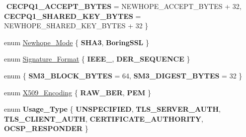 \begin{DoxyCompactItemize}
$$\newline
{\bfseries C\+E\+C\+P\+Q1\+\_\+\+A\+C\+C\+E\+P\+T\+\_\+\+B\+Y\+T\+ES} = N\+E\+W\+H\+O\+P\+E\+\_\+\+A\+C\+C\+E\+P\+T\+\_\+\+B\+Y\+T\+ES + 32, 
{\bfseries C\+E\+C\+P\+Q1\+\_\+\+S\+H\+A\+R\+E\+D\+\_\+\+K\+E\+Y\+\_\+\+B\+Y\+T\+ES} = N\+E\+W\+H\+O\+P\+E\+\_\+\+S\+H\+A\+R\+E\+D\+\_\+\+K\+E\+Y\+\_\+\+B\+Y\+T\+ES + 32
 \}
\item 
enum \hyperlink{namespace_botan_a42a70d7cfb95e4f7773d3b52dc98ad61}{Newhope\+\_\+\+Mode} \{ {\bfseries S\+H\+A3}, 
{\bfseries Boring\+S\+SL}
 \}
\item 
enum \hyperlink{namespace_botan_ad8a9578625edf847cbcba3ae15648cda}{Signature\+\_\+\+Format} \{ {\bfseries I\+E\+E\+E\+\_}, 
{\bfseries D\+E\+R\+\_\+\+S\+E\+Q\+U\+E\+N\+CE}
 \}
\item 
\mbox{\label{namespace_botan_a00c9c4f3dbf31294f0a3b36f82e9d5c0}} 
enum \{ {\bfseries S\+M3\+\_\+\+B\+L\+O\+C\+K\+\_\+\+B\+Y\+T\+ES} = 64, 
{\bfseries S\+M3\+\_\+\+D\+I\+G\+E\+S\+T\+\_\+\+B\+Y\+T\+ES} = 32
 \}
\item 
enum \hyperlink{namespace_botan_a53759b4ed1fb93549f307fcf68729d2f}{X509\+\_\+\+Encoding} \{ {\bfseries R\+A\+W\+\_\+\+B\+ER}, 
{\bfseries P\+EM}
 \}
\item 
\mbox{\label{namespace_botan_aa9f60e06eee177e95f8b2fb017e0ecba}} 
enum {\bfseries Usage\+\_\+\+Type} \{ \newline
{\bfseries U\+N\+S\+P\+E\+C\+I\+F\+I\+ED}, 
{\bfseries T\+L\+S\+\_\+\+S\+E\+R\+V\+E\+R\+\_\+\+A\+U\+TH}, 
{\bfseries T\+L\+S\+\_\+\+C\+L\+I\+E\+N\+T\+\_\+\+A\+U\+TH}, 
{\bfseries C\+E\+R\+T\+I\+F\+I\+C\+A\+T\+E\+\_\+\+A\+U\+T\+H\+O\+R\+I\+TY}, 
\newline
{\bfseries O\+C\+S\+P\+\_\+\+R\+E\+S\+P\+O\+N\+D\+ER}
 \}
\end{DoxyCompactItemize}
